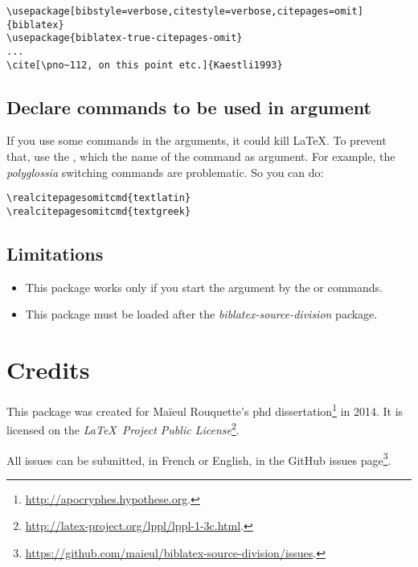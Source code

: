 \documentclass{ltxdockit}[2011/03/25]
\begin{document}
\begin{verbatim}
\usepackage[bibstyle=verbose,citestyle=verbose,citepages=omit]{biblatex}
\usepackage{biblatex-true-citepages-omit}
...
\cite[\pno~112, on this point etc.]{Kaestli1993}
\end{verbatim}


\citereset
{}
\begin{quotation}
\cite[\pno~112, on this point etc.]{Kaestli1993}
\end{quotation}
\subsection{Declare commands to be used in  argument}

If you use some commands in the  arguments, it could kill \LaTeX. To prevent that, use the , which the name of the command as argument. For example, the \emph{polyglossia} switching commands are problematic. So you can do:
\begin{verbatim}
\realcitepagesomitcmd{textlatin}
\realcitepagesomitcmd{textgreek}
\end{verbatim}
\subsection{Limitations}

\begin{itemize}
	\item This package works only if you start the    argument by the  or  commands.
	\item This package must be loaded after the \emph{biblatex-source-division} package.
\end{itemize}
\section{Credits}

This package was created for Maïeul Rouquette's phd dissertation\footnote{\url{http://apocryphes.hypothese.org}.} in 2014. It is licensed on the \emph{\LaTeX\ Project Public License}\footnote{\url{http://latex-project.org/lppl/lppl-1-3c.html}.}. 


All issues can be submitted, in French or English, in the GitHub issues page\footnote{\url{https://github.com/maieul/biblatex-source-division/issues}.}.
\end{document}
